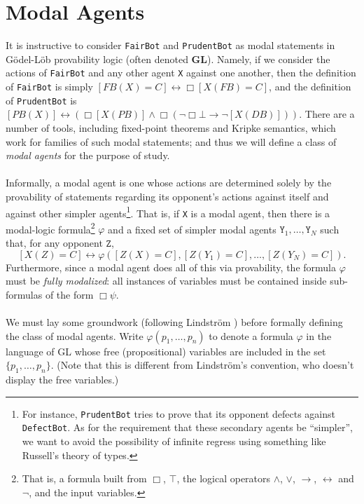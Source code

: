 \documentclass[12pt, letterpaper]{article}
\numberwithin{equation}{section}
\begin{document}
\section{Modal Agents}
\label{Modal Agents}
It is instructive to consider \texttt{FairBot} and \texttt{PrudentBot} as modal statements in G\"{o}del-L\"{o}b provability logic (often denoted \textbf{GL}). Namely, if we consider the actions of \texttt{FairBot} and any other agent \texttt{X} against one another, then the definition of \texttt{FairBot} is simply $[FB(X)=C]\leftrightarrow \Box [X(FB)=C]$, and the definition of \texttt{PrudentBot} is $[PB(X)]\leftrightarrow (\Box[X(PB)]\wedge \Box(\neg\Box\bot\to\neg[X(DB)])).$ There are a number of tools, including fixed-point theorems and Kripke semantics, which work for families of such modal statements; and thus we will define a class of \emph{modal agents} for the purpose of study.
\\
\\ Informally, a modal agent is one whose actions are determined solely by the provability of statements regarding its opponent's actions against itself and against other simpler agents\footnote{For instance, \texttt{PrudentBot} tries to prove that its opponent defects against \texttt{DefectBot}. As for the requirement that these secondary agents be ``simpler'', we want to avoid the possibility of infinite regress using something like Russell's theory of types.}. That is, if \texttt{X} is a modal agent, then there is a modal-logic formula\footnote{That is, a formula built from $\Box$, $\top$, the logical operators $\wedge$, $\vee$, $\rightarrow$, $\leftrightarrow$ and $\neg$, and the input variables.} $\varphi$ and a fixed set of simpler modal agents $\texttt Y_1,\dots,\texttt Y_N$ such that, for any opponent $\texttt Z$, 
\begin{equation}
\label{modalagent}
[X(Z)=C]\leftrightarrow \varphi\left([Z(X)=C],[Z(Y_1)=C],\dots,[Z(Y_N)=C]\right).
\end{equation}
Furthermore, since a modal agent does all of this via provability, the formula $\varphi$ must be \emph{fully modalized}: all instances of variables must be contained inside sub-formulas of the form $\Box\psi$.
\\
\\We must lay some groundwork (following Lindstr\"om \cite{Lindstrom}) before formally defining the class of modal agents. Write $\varphi(p_1,\dotsc,p_n)$ to denote a formula $\varphi$ in the language of \textsf{GL} whose free (propositional) variables are included in the set $\{p_1,\dotsc,p_n\}$. (Note that this is different from Lindstr\"om's convention, who doesn't display the free variables.)
\end{document}
